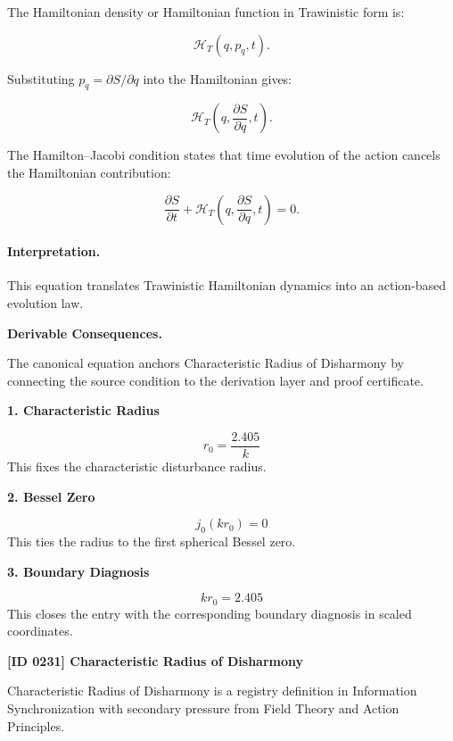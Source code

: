 The Hamiltonian density or Hamiltonian function in Trawinistic form is:

\begin{equation}
\mathcal{H}_T(q,p_q,t).
\end{equation}

Substituting $p_q=\partial S/\partial q$ into the Hamiltonian gives:

\begin{equation}
\mathcal{H}_T
\left(
q,\frac{\partial S}{\partial q},t
\right).
\end{equation}

The Hamilton--Jacobi condition states that time evolution of the action cancels the Hamiltonian contribution:

\begin{equation}
\boxed{
\frac{\partial S}{\partial t}
+
\mathcal{H}_T
\left(
q,\frac{\partial S}{\partial q},t
\right)
=
0 .
}
\end{equation}

\paragraph{Interpretation.}
This equation translates Trawinistic Hamiltonian dynamics into an action-based evolution law.

\par\vspace{0.35em}
\noindent\textbf{Derivable Consequences.}\quad
\begingroup
\footnotesize
\raggedright
The canonical equation anchors Characteristic Radius of Disharmony by connecting the source condition to the derivation layer and proof certificate.
\par\endgroup

\noindent\textbf{1. Characteristic Radius}\par
\[
r_0 = \frac{2.405}{k}
\]
\noindent This fixes the characteristic disturbance radius.\par
\noindent\textbf{2. Bessel Zero}\par
\[
j_0(k r_0)=0
\]
\noindent This ties the radius to the first spherical Bessel zero.\par
\noindent\textbf{3. Boundary Diagnosis}\par
\[
k r_0 = 2.405
\]
\noindent This closes the entry with the corresponding boundary diagnosis in scaled coordinates.\par

\clearpage
\noindent\textbf{[ID 0231] Characteristic Radius of Disharmony}\par
\vspace{0.35em}
\begingroup\small
{}
Characteristic Radius of Disharmony is a registry definition in Information Synchronization with secondary pressure from Field Theory and Action Principles.

